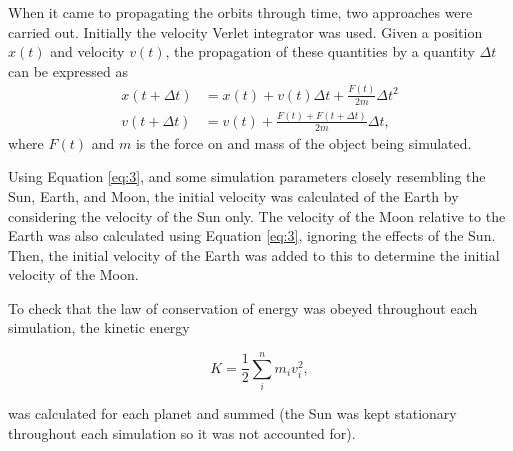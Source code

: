 \documentclass[12pt, english]{report}
\begin{document}

\normalsize{When it came to propagating the orbits through time, two approaches were carried out. Initially the velocity Verlet integrator was used. Given a position $x(t)$ and velocity $v(t)$, the propagation of these quantities by a quantity $\Delta t$ can be expressed as 
\begin{align}
    x(t + \Delta t) &= x(t) + v(t)\Delta t  + \frac{F(t)}{2m} \Delta t^2 \\ 
    v(t + \Delta t) &= v(t) + \frac{F(t) + F(t + \Delta t)}{2m} \Delta t,
\end{align} where $F(t)$ and $m$ is the force on and mass of the object being simulated.}

\normalsize{Using Equation \ref{eq:3}, and some simulation parameters closely resembling the Sun, Earth, and Moon, the initial velocity was calculated of the Earth by considering the velocity of the Sun only. The velocity of the Moon relative to the Earth was also calculated using Equation \ref{eq:3}, ignoring the effects of the Sun. Then, the initial velocity of the Earth was added to this to determine the initial velocity of the Moon.

To check that the law of conservation of energy was obeyed throughout each simulation, the kinetic energy 

\begin{equation}
    K = \frac{1}{2} \sum^n_i m_i v_i^2,
\end{equation}
}
was calculated for each planet and summed (the Sun was kept stationary throughout each simulation so it was not accounted for). 
\end{document}
